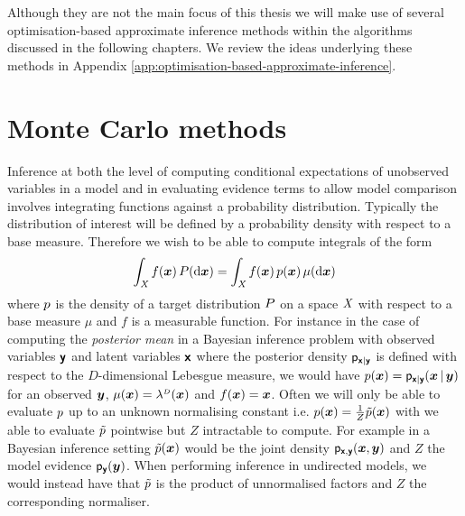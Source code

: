 Although they are not the main focus of this thesis we will make use of several optimisation-based approximate inference methods within the algorithms discussed in the following chapters. We review the ideas underlying these methods in Appendix \ref{app:optimisation-based-approximate-inference}. 

\section{Monte Carlo methods}

Inference at both the level of computing conditional expectations of unobserved variables in a model and in evaluating evidence terms to allow model comparison involves integrating functions against a probability distribution. Typically the distribution of interest will be defined by a probability density with respect to a base measure. Therefore we wish to be able to compute integrals of the form
\begin{equation}\label{eq:integral-against-density}
  \int_{\mathit{X}} f(\boldsymbol{x}) \, P(\mathrm{d}\boldsymbol{x}) =
  \int_{\mathit{X}} f(\boldsymbol{x}) \, p(\boldsymbol{x}) \,\mu(\mathrm{d}\boldsymbol{x})
\end{equation}
where $p$ is the density of a target distribution $P$ on a space $\mathit{X}$ with respect to a base measure $\mu$ and $f$ is a measurable function. For instance in the case of computing the \emph{posterior mean} in a Bayesian inference problem with observed variables $\boldsymbol{\mathsf{y}}$ and latent variables $\boldsymbol{\mathsf{x}}$ where the posterior density $\mathsf{p}_{\boldsymbol{\mathsf{x}}|\boldsymbol{\mathsf{y}}}$ is defined with respect to the $D$-dimensional Lebesgue measure, we would have  $p(\boldsymbol{x}) = \mathsf{p}_{\boldsymbol{\mathsf{x}}|\boldsymbol{\mathsf{y}}}(\boldsymbol{x}\operatorname{|}\boldsymbol{y})$ for an observed $\boldsymbol{y}$, $\mu(\vct{x}) = \lebm{D}(\vct{x})$ and $f(\boldsymbol{x}) = \boldsymbol{x}$. Often we will only be able to evaluate $p$ up to an unknown normalising constant i.e. $p(\boldsymbol{x}) = \frac{1}{Z}\tilde{p}(\boldsymbol{x})$ with we able to evaluate $\tilde{p}$ pointwise but $Z$ intractable to compute. For example in a Bayesian inference setting $\tilde{p}(\boldsymbol{x})$ would be the joint density $\mathsf{p}_{\boldsymbol{\mathsf{x}},\boldsymbol{\mathsf{y}}}(\boldsymbol{x},\boldsymbol{y})$ and $Z$ the model evidence $\mathsf{p}_{\boldsymbol{\mathsf{y}}}(\boldsymbol{y})$. When performing inference in undirected models, we would instead have that $\tilde{p}$ is the product of unnormalised factors and $Z$ the corresponding normaliser.


